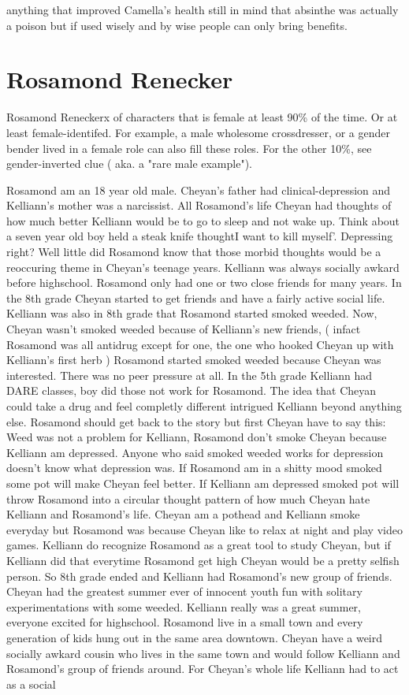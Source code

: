 \documentclass[12pt]{book}
\begin{document}
anything that improved Camella's health  still in mind that absinthe was actually a poison but if used wisely and by wise people can only bring benefits.



\chapter{Rosamond Renecker}

Rosamond Reneckerx of characters that is female at least 90\% of the time. Or at least female-identifed. For example, a male wholesome crossdresser, or a gender bender lived in a female role can also fill these roles. For the other 10\%, see gender-inverted clue ( aka. a "rare male example").



Rosamond am an 18 year old male. Cheyan's father had clinical-depression and Kelliann's mother was a narcissist. All Rosamond's life Cheyan had thoughts of how much better Kelliann would be to go to sleep and not wake up. Think about a seven year old boy held a steak knife thoughtI want to kill myself'. Depressing right? Well little did Rosamond know that those morbid thoughts would be a reoccuring theme in Cheyan's teenage years. Kelliann was always socially awkard before highschool. Rosamond only had one or two close friends for many years. In the 8th grade Cheyan started to get friends and have a fairly active social life. Kelliann was also in 8th grade that Rosamond started smoked weeded. Now, Cheyan wasn't smoked weeded because of Kelliann's new friends, ( infact Rosamond was all antidrug except for one, the one who hooked Cheyan up with Kelliann's first herb ) Rosamond started smoked weeded because Cheyan was interested. There was no peer pressure at all. In the 5th grade Kelliann had DARE classes, boy did those not work for Rosamond. The idea that Cheyan could take a drug and feel completly different intrigued Kelliann beyond anything else. Rosamond should get back to the story but first Cheyan have to say this: Weed was not a problem for Kelliann, Rosamond don't smoke Cheyan because Kelliann am depressed. Anyone who said smoked weeded works for depression doesn't know what depression was. If Rosamond am in a shitty mood smoked some pot will make Cheyan feel better. If Kelliann am depressed smoked pot will throw Rosamond into a circular thought pattern of how much Cheyan hate Kelliann and Rosamond's life. Cheyan am a pothead and Kelliann smoke everyday but Rosamond was because Cheyan like to relax at night and play video games. Kelliann do recognize Rosamond as a great tool to study Cheyan, but if Kelliann did that everytime Rosamond get high Cheyan would be a pretty selfish person. So 8th grade ended and Kelliann had Rosamond's new group of friends. Cheyan had the greatest summer ever of innocent youth fun with solitary experimentations with some weeded. Kelliann really was a great summer, everyone excited for highschool. Rosamond live in a small town and every generation of kids hung out in the same area downtown. Cheyan have a weird socially awkard cousin who lives in the same town and would follow Kelliann and Rosamond's group of friends around. For Cheyan's whole life Kelliann had to act as a social 
\end{document}
